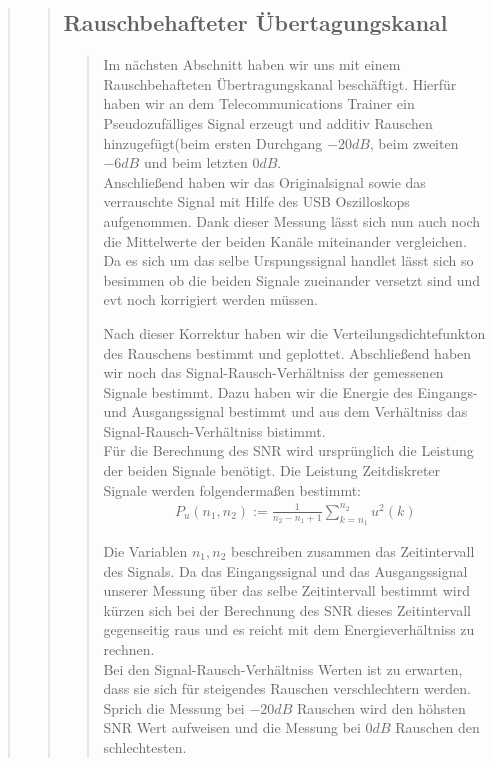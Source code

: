 \begin{quote}
\begin{quote}
    \subsection{Rauschbehafteter Übertagungskanal}
    \begin{quote}
        Im nächsten Abschnitt haben wir uns mit einem Rauschbehafteten Übertragungskanal beschäftigt. Hierfür haben wir
        an dem Telecommunications Trainer ein Pseudozufälliges Signal erzeugt und additiv Rauschen hinzugefügt(beim
        ersten Durchgang $-20dB$, beim zweiten $-6dB$ und beim letzten $0dB$.\\
        Anschließend haben wir das Originalsignal sowie das verrauschte Signal mit Hilfe des USB Oszilloskops
        aufgenommen. Dank dieser Messung lässt sich nun auch noch die Mittelwerte der beiden Kanäle miteinander
        vergleichen. Da es sich um das selbe Urspungssignal handlet lässt sich so besimmen ob die beiden Signale
        zueinander versetzt sind und evt noch korrigiert werden müssen.\vspace{1em}
        
        Nach dieser Korrektur haben wir die Verteilungsdichtefunkton des Rauschens bestimmt und geplottet. Abschließend
        haben wir noch das Signal-Rausch-Verhältniss der gemessenen Signale bestimmt. Dazu haben wir die Energie des
        Eingangs- und Ausgangssignal bestimmt und aus dem Verhältniss das Signal-Rausch-Verhältniss bistimmt.\\
        Für die Berechnung des SNR wird ursprünglich die Leistung der beiden Signale benötigt. Die Leistung
        Zeitdiskreter Signale werden folgendermaßen bestimmt:
        \begin{equation*}
        	\begin{split}
        		P_u(n_1, n_2) := \frac{1}{n_2 - n_1 + 1} \sum_{k=n_1}^{n_2} u^2 (k)
        	\end{split}
        \end{equation*}
        
        Die Variablen $n_1,n_2$ beschreiben zusammen das Zeitintervall des Signals. Da das Eingangssignal und das
        Ausgangssignal unserer Messung über das selbe Zeitintervall bestimmt wird kürzen sich bei der Berechnung des SNR
        dieses Zeitintervall gegenseitig raus und es reicht mit dem Energieverhältniss zu rechnen.\\
        Bei den Signal-Rausch-Verhältniss Werten ist zu erwarten, dass sie sich für steigendes Rauschen verschlechtern
        werden. Sprich die Messung bei $-20dB$ Rauschen wird den höhsten SNR Wert aufweisen und die Messung bei $0dB$
        Rauschen den schlechtesten.


\end{quote}
\end{quote}
\end{quote}
